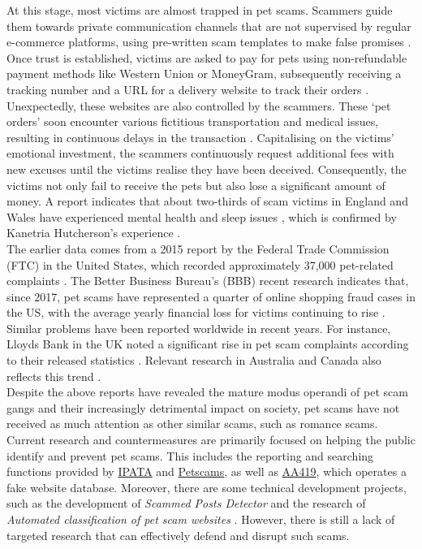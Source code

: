 \documentclass[ oneside,%
                    author={Cassie Qing Tang},
                    degree={BSc},
                     title={An Automated Response System for Disrupting Online Pet Scamming \\ },
                    subtitle={ }]{dissertation}
\begin{document}
At this stage, most victims are almost trapped in pet scams. Scammers guide them towards private communication channels that are not supervised by regular e-commerce platforms, using pre-written scam templates to make false promises \cite{ipata_current_nodate}. Once trust is established, victims are asked to pay for pets using non-refundable payment methods like Western Union or MoneyGram, subsequently receiving a tracking number and a URL for a delivery website to track their orders \cite{price_resource_2020}. Unexpectedly, these websites are also controlled by the scammers. These `pet orders' soon encounter various fictitious transportation and medical issues, resulting in continuous delays in the transaction \cite{price_resource_2020}. Capitalising on the victims' emotional investment, the scammers continuously request additional fees with new excuses until the victims realise they have been deceived. Consequently, the victims not only fail to receive the pets but also lose a significant amount of money. A report indicates that about two-thirds of scam victims in England and Wales have experienced mental health and sleep issues \cite{shaw_report_2024}, which is confirmed by Kanetria Hutcherson's experience \cite{better_business_bureau_bbb_2017}.
\\

The earlier data comes from a 2015 report by the Federal Trade Commission (FTC) in the United States, which recorded approximately 37,000 pet-related complaints \cite{better_business_bureau_bbb_2017}. The Better Business Bureau's (BBB) recent research indicates that, since 2017, pet scams have represented a quarter of online shopping fraud cases in the US, with the average yearly financial loss for victims continuing to rise \cite{better_business_bureau_bbb_2022}. Similar problems have been reported worldwide in recent years. For instance, Lloyds Bank in the UK noted a significant rise in pet scam complaints according to their released statistics \cite{lloyds_bank_fraudsters_2023}. Relevant research in Australia and Canada also reflects this trend \cite{better_business_bureau_bbb_2017}.
\\

Despite the above reports have revealed the mature modus operandi of pet scam gangs and their increasingly detrimental impact on society, pet scams have not received as much attention as other similar scams, such as romance scams. Current research and countermeasures are primarily focused on helping the public identify and prevent pet scams. This includes the reporting and searching functions provided by \href{https://www.ipata.org/pet-scams}{IPATA} and \href{www.petscams.com}{Petscams}, as well as \href{www.aa419.org}{AA419}, which operates a fake website database. Moreover, there are some technical development projects, such as the development of \textit{Scammed Posts Detector} \cite{norazman_development_2014} and the research of \textit{Automated classification of pet scam websites} \cite{mehmedov_automated_2021}. However, there is still a lack of targeted research that can effectively defend and disrupt such scams.
\\
\end{document}
